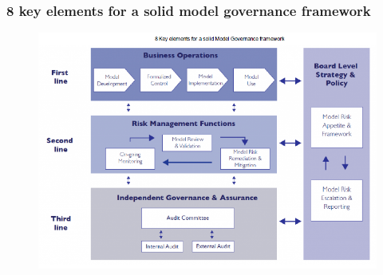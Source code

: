 \documentclass[11pt]{beamer}
\begin{document}
\begin{frame}
\frametitle{8 key elements for a solid model governance framework}
\begin{figure}[h]
	\centering
	\includegraphics[scale=.5]{images/gov1}
\end{figure}
\end{frame}
\end{document}
